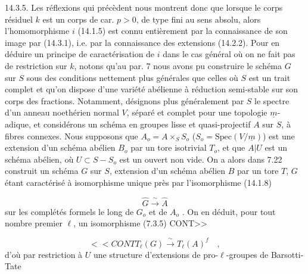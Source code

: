 14.3.5. Les réflexions qui précèdent nous montrent donc que lorsque le corps résiduel $k$ est un corps de car. $p > 0$, de type fini au sens absolu, alors l'homomorphisme $i$ (14.1.5) est connu entièrement par la connaissance de son image par (14.3.1), i.e. par la connaissance des extensions (14.2.2). Pour en déduire un principe de caractérisation de $i$ dans le cas général où on ne fait pas de restriction sur $k$, notons qu'au par. 7 nous avons pu construire le schéma $G$ sur $S$ sous des conditions nettement plus générales que celles où $S$ est un trait complet et qu'on dispose d'une variété abélienne à réduction semi-stable sur son corps des fractions. Notamment, désignons plus généralement par $S$ le spectre d'un anneau noethérien normal $V$, séparé et complet pour une topologie $\underline{m}$-adique, et considérons un schéma en groupes lisse et quasi-projectif $A$ sur $S$, à fibres connexes. Nous supposons que $A_o = A \times_S S_o$ ($S_o = \mathrm{Spec}(V/\underline{m})$) est une extension d'un schéma abélien $B_o$ par un tore isotrivial $T_o$, et que $A|U$ est un schéma abélien, où $U \subset S - S_o$ est un ouvert non vide. On a alors dans 7.22 construit un schéma $G$ sur $S$, extension d'un schéma abélien $B$ par un tore $T$, $G$ étant caractérisé à isomorphisme unique près par l'isomorphisme (14.1.8)

\begin{equation}\tag{14.3.5.1}
\hat{G} \xrightarrow{\ \sim\ } \hat{A}
\end{equation}
sur les complétés formels le long de $G_o$ et de $A_o$ . On en déduit, pour tout nombre premier $\ell$, un isomorphisme (7.3.5) CONT>>



\begin{equation}\tag{14.3.5.2}
<<CONT T_\ell(G) \xrightarrow{\ \sim\ } T_\ell(A)^f \quad ,
\end{equation}
d'où par restriction à $U$ une structure d'extensions de pro-$\ell$-groupes de Barsotti-Tate

